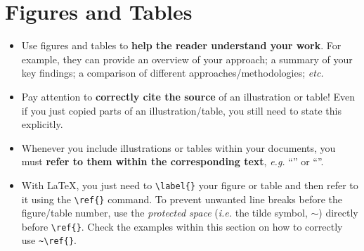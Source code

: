 \documentclass[11pt,a4paper]{article}
\begin{document}
\section{Figures and Tables}
\label{sec-figures}
\begin{itemize}
\item Use figures and tables to \textbf{help the reader understand your work}. For example, they can provide an overview of your approach; a summary of your key findings; a comparison of different approaches/methodologies; \emph{etc.}
 
\item Pay attention to \textbf{correctly cite the source} of an illustration or table! Even if you just copied parts of an illustration/table, you still need to state this explicitly.
 
\item Whenever you include illustrations or tables within your documents, you must \textbf{refer to them within the corresponding text}, \emph{e.g.} ``'' or ``''.

\item With \LaTeX, you just need to \verb,\label{}, your figure or table and then refer to it using the \verb,\ref{}, command.
To prevent unwanted line breaks before the figure/table number, use the \emph{protected space} (\emph{i.e.} the tilde symbol, $\sim$) directly before \verb,\ref{},.
Check the examples within this section on how to correctly use \verb,~\ref{},.
\end{itemize}
\end{document}
